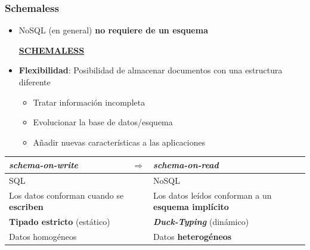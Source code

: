 \documentclass[14pt]{beamer}
\begin{document}
\begin{frame}[allowframebreaks]
  \frametitle{Schemaless}
\begin{itemize}
\item NoSQL (en general) {\bf no requiere de un esquema}
\begin{alertblock}{}
  \centering
  \href{https://farm6.staticflickr.com/5483/29931060254_109e3e36da_o_d.jpg}{\bf
    SCHEMALESS}
\end{alertblock}
\item {\bf Flexibilidad}: Posibilidad de almacenar documentos con una
  estructura diferente
\begin{itemize}
\item Tratar información incompleta
\item Evolucionar la base de datos/esquema
\item Añadir nuevas características a las aplicaciones
\end{itemize}
\end{itemize}

\framebreak

\begin{small}
\begin{tabular}{p{}cp{}}
{\bfseries\itshape schema-on-write}&$\Rightarrow$&{\bfseries\itshape
                                                   schema-on-read}\\
\hline
SQL&&NoSQL\\
Los datos conforman cuando se {\bf escriben}&&Los datos leídos conforman a
                                               un {\bf esquema implícito}\\
{\bf Tipado estricto} (estático) && {\bfseries\itshape Duck-Typing}
                                    (dinámico) \\
Datos homogéneos && Datos {\bf heterogéneos}
\end{tabular}
\end{small}
\end{frame}
\end{document}
